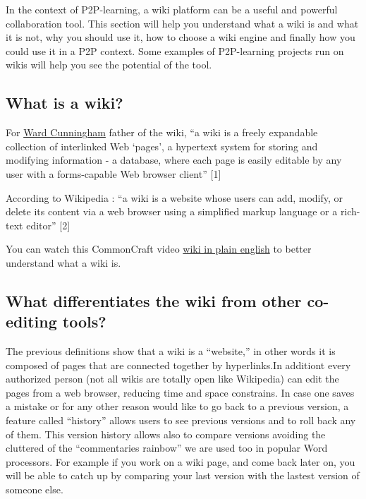 In the context of P2P-learning, a wiki platform can be a useful and
powerful collaboration tool. This section will help you understand what
a wiki is and what it is not, why you should use it, how to choose a
wiki engine and finally how you could use it in a P2P context. Some
examples of P2P-learning projects run on wikis will help you see the
potential of the tool.

\subsection{What is a wiki?}

For \href{http://en.wikipedia.org/wiki/Ward\_cunningham}{Ward
Cunningham} father of the wiki, ``a wiki is a freely expandable
collection of interlinked Web `pages', a hypertext system for storing
and modifying information - a database, where each page is easily
editable by any user with a forms-capable Web browser client'' {[}1{]}

According to Wikipedia : ``a wiki is a website whose users can add,
modify, or delete its content via a web browser using a simplified
markup language or a rich-text editor'' {[}2{]}

You can watch this CommonCraft video
\href{http://www.youtube.com/watch?v=-dnL00TdmLY}{wiki in plain english}
to better understand what a wiki is.

\subsection{What differentiates the wiki from other co-editing tools?}

The previous definitions show that a wiki is a ``website,'' in other
words it is composed of pages that are connected together by
hyperlinks.In additiont every authorized person (not all wikis are
totally open like Wikipedia) can edit the pages from a web browser,
reducing time and space constrains. In case one saves a mistake or for
any other reason would like to go back to a previous version, a feature
called ``history'' allows users to see previous versions and to roll
back any of them. This version history allows also to compare versions
avoiding the cluttered of the ``commentaries rainbow'' we are used too
in popular Word processors. For example if you work on a wiki page, and
come back later on, you will be able to catch up by comparing your last
version with the lastest version of someone else.

